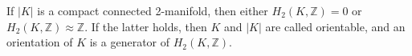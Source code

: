 If $|K|$ is a compact connected 2-manifold, then either $H_2(K, \mathbb{Z}) = 0$ or $H_2(K, \mathbb{Z}) \approx \mathbb{Z}$. If the latter holds, then $K$ and $|K|$ are called orientable, and an orientation of $K$ is a generator of $H_2(K, \mathbb{Z})$.
